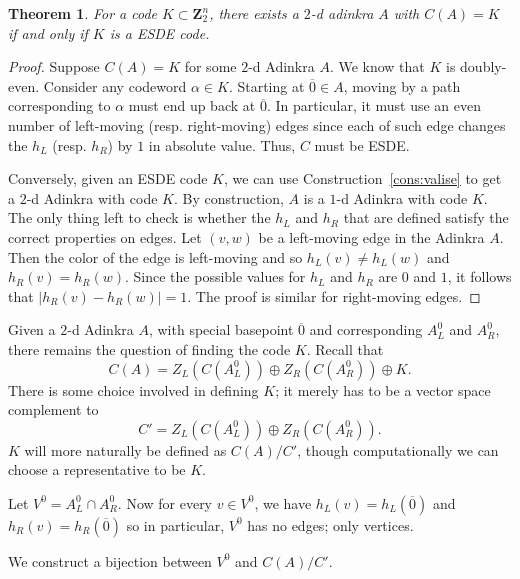 \documentclass[12pt,twoside,singlespace]{article}
\numberwithin{equation}{section}
\newtheorem{thm}[equation]{Theorem}
\theoremstyle{definition}
\newcommand{\ZZ}{\mathbf{Z}}
\begin{document}
\begin{thm}
\label{thm:esde}
For a code $K \subset \ZZ_2^n$, there exists a $2$-d adinkra $A$ with $C(A) = K$ if and only if $K$ is a ESDE code.
\end{thm}
\begin{proof}
Suppose $C(A) = K$ for some $2$-d Adinkra $A$. We know that $K$ is doubly-even. Consider any codeword $\alpha \in K$. Starting at $\overline{0} \in A$, moving by a path corresponding to $\alpha$ must end up back at $\overline{0}$. In particular, it must use an even number of left-moving (resp. right-moving) edges since each of such edge changes the $h_L$ (resp. $h_R$) by $1$ in absolute value. Thus, $C$ must be ESDE. 

Conversely, given an ESDE code $K$, we can use Construction~\ref{cons:valise} to get a $2$-d Adinkra with code $K$. By construction, $A$ is a $1$-d Adinkra with code $K$.  The only thing left to check is whether the $h_L$ and $h_R$ that are defined satisfy the correct properties on edges. Let $(v,w)$ be a left-moving edge in the Adinkra $A$.  Then the color of the edge is left-moving and so $h_L(v)\not=h_L(w)$ and $h_R(v)=h_R(w)$.  Since the possible values for $h_L$ and $h_R$ are $0$ and $1$, it follows that $|h_R(v)-h_R(w)|=1$. The proof is similar for right-moving edges.

\end{proof}

Given a $2$-d Adinkra $A$, with special basepoint $\overline{0}$ and corresponding $A_L^0$ and $A_R^0$, there remains the question of finding the code $K$.  Recall that
\[C(A)=Z_L(C(A_L^0))\oplus Z_R(C(A_R^0))\oplus K.\]
There is some choice involved in defining $K$; it merely has to be a vector space complement to
\[C'=Z_L(C(A_L^0))\oplus Z_R(C(A_R^0)).\]
$K$ will more naturally be defined as $C(A)/C'$, though computationally we can choose a representative to be $K$.


Let $V^0=A_L^0\cap A_R^0$.  Now for every $v\in V^0$, we have $h_L(v)=h_L(\overline{0})$ and $h_R(v)=h_R(\overline{0})$ so in particular, $V^0$ has no edges; only vertices.

We construct a bijection between $V^0$ and $C(A)/C'$.
\end{document}
